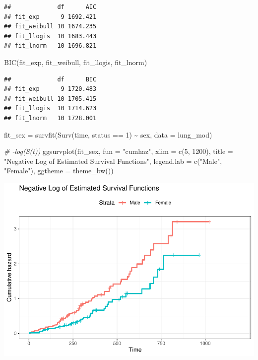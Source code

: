 \documentclass[
]{article}
\newenvironment{Shaded}{\begin{snugshade}}{\end{snugshade}}
\newcommand{\AttributeTok}[1]{\textcolor[rgb]{0.77,0.63,0.00}{#1}}
\newcommand{\CommentTok}[1]{\textcolor[rgb]{0.56,0.35,0.01}{\textit{#1}}}
\newcommand{\DecValTok}[1]{\textcolor[rgb]{0.00,0.00,0.81}{#1}}
\newcommand{\FunctionTok}[1]{\textcolor[rgb]{0.00,0.00,0.00}{#1}}
\newcommand{\NormalTok}[1]{#1}
\newcommand{\OtherTok}[1]{\textcolor[rgb]{0.56,0.35,0.01}{#1}}
\newcommand{\SpecialCharTok}[1]{\textcolor[rgb]{0.00,0.00,0.00}{#1}}
\newcommand{\StringTok}[1]{\textcolor[rgb]{0.31,0.60,0.02}{#1}}
\begin{document}
\begin{verbatim}
##             df      AIC
## fit_exp      9 1692.421
## fit_weibull 10 1674.235
## fit_llogis  10 1683.443
## fit_lnorm   10 1696.821
\end{verbatim}

\begin{Shaded}
\begin{Highlighting}[]
\FunctionTok{BIC}\NormalTok{(fit\_exp, fit\_weibull, fit\_llogis, fit\_lnorm)}
\end{Highlighting}
\end{Shaded}

\begin{verbatim}
##             df      BIC
## fit_exp      9 1720.483
## fit_weibull 10 1705.415
## fit_llogis  10 1714.623
## fit_lnorm   10 1728.001
\end{verbatim}

\begin{Shaded}
\begin{Highlighting}[]
\NormalTok{fit\_sex }\OtherTok{=} \FunctionTok{survfit}\NormalTok{(}\FunctionTok{Surv}\NormalTok{(time, status }\SpecialCharTok{==} \DecValTok{1}\NormalTok{) }\SpecialCharTok{\textasciitilde{}}\NormalTok{ sex, }\AttributeTok{data =}\NormalTok{ lung\_mod)}

\CommentTok{\# {-}log(S(t))}
\FunctionTok{ggsurvplot}\NormalTok{(fit\_sex, }
           \AttributeTok{fun =} \StringTok{"cumhaz"}\NormalTok{,}
           \AttributeTok{xlim =} \FunctionTok{c}\NormalTok{(}\DecValTok{5}\NormalTok{, }\DecValTok{1200}\NormalTok{),}
           \AttributeTok{title =} \StringTok{"Negative Log of Estimated Survival Functions"}\NormalTok{,}
           \AttributeTok{legend.lab =} \FunctionTok{c}\NormalTok{(}\StringTok{"Male"}\NormalTok{, }\StringTok{"Female"}\NormalTok{),}
           \AttributeTok{ggtheme =} \FunctionTok{theme\_bw}\NormalTok{())}
\end{Highlighting}
\end{Shaded}

\includegraphics{final_project_files/figure-latex/unnamed-chunk-40-1.pdf}
\end{document}
